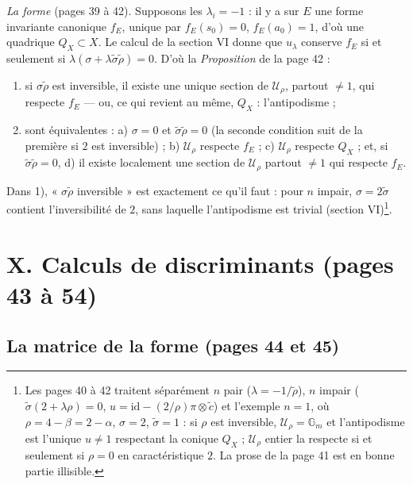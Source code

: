 \documentclass[11pt,a4paper]{article}
\begin{document}
\emph{La forme} (pages 39 à 42). Supposons les $\lambda_i = -1$ : il y a sur $E$
une forme invariante canonique $f_E$, unique par $f_E(s_0) = 0$, $f_E(a_0) =
1$, d'où une quadrique $Q_X \subset X$. Le calcul de la section VI donne que
$u_\lambda$ conserve $f_E$ si et seulement si $\lambda(\sigma +
\lambda\tilde\sigma\tilde\rho) = 0$. D'où la \emph{Proposition} de la page 42 :
\begin{enumerate}
  \item[1)] si $\sigma\tilde\rho$ est inversible, il existe une unique section
    de $\mathcal{U}_\rho$, partout $\neq 1$, qui respecte $f_E$ --- ou, ce qui
    revient au même, $Q_X$ : l'antipodisme ;
  \item[2)] sont équivalentes : a) $\sigma = 0$ et $\tilde\sigma\tilde\rho = 0$
    (la seconde condition suit de la première si $2$ est inversible) ; b)
    $\mathcal{U}_\rho$ respecte $f_E$ ; c) $\mathcal{U}_\rho$ respecte $Q_X$ ;
    et, si $\tilde\sigma\tilde\rho = 0$, d) il existe localement une section de
    $\mathcal{U}_\rho$ partout $\neq 1$ qui respecte $f_E$.
\end{enumerate}
Dans 1), « $\sigma\tilde\rho$ inversible » est exactement ce qu'il faut : pour
$n$ impair, $\sigma = 2\tilde\sigma$ contient l'inversibilité de $2$, sans
laquelle l'antipodisme est trivial (section VI)\footnote{Les pages 40 à 42
traitent séparément $n$ pair ($\lambda = -1/\tilde\rho$), $n$ impair
($\tilde\sigma(2 + \lambda\rho) = 0$, $u = \mathrm{id} - (2/\rho)\pi \otimes
\tilde c$) et l'exemple $n = 1$, où $\rho = 4 - \beta = 2 - \alpha$, $\sigma =
2$, $\tilde\sigma = 1$ : si $\rho$ est inversible, $\mathcal{U}_\rho =
\mathbb{G}_m$ et l'antipodisme est l'unique $u \neq 1$ respectant la conique
$Q_X$ ; $\mathcal{U}_\rho$ entier la respecte si et seulement si $\rho = 0$ en
caractéristique $2$. La prose de la page 41 est en bonne partie illisible.}.

\section*{X. Calculs de discriminants (pages 43 à 54)}

\subsection*{La matrice de la forme (pages 44 et 45)}
\end{document}
